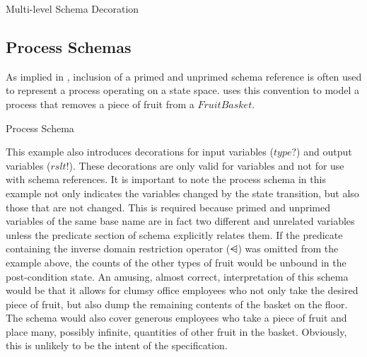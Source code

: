 \documentclass[letterpaper,10pt,draft]{book}
\begin{document}
\begin{example}
\begin{minipage}[t]{0.49\linewidth}
   
\end{minipage}
\begin{minipage}[t]{0.49\linewidth}
   \azsch
   
\end{minipage}

   \caption{Multi-level Schema Decoration}
   \label{ex:SchemaMultiDecor}
\end{example}

\subsection{Process Schemas}
   \label{sect:SchProcess}

As implied in , inclusion of a primed and unprimed schema
reference is often used to represent a process operating on a state space.  
uses this convention to model a process that removes a piece of fruit from a $FruitBasket$.

\begin{example}
\begin{minipage}[t]{0.49\linewidth}
   
\end{minipage}
\begin{minipage}[t]{0.49\linewidth}
   \azsch
   
\end{minipage}

   \caption{Process Schema}
   \label{ex:SchemaProc}
\end{example}

This example also introduces decorations for input variables ($type?$) and output
variables ($rslt!$).  These decorations are only valid for variables and not for
use with schema references.  It is important to note the process schema in this example
not only indicates the variables changed by the state transition, but also those
that are not changed.  This is required because primed and unprimed variables of
the same base name are in fact two different and unrelated variables unless the
predicate section of schema explicitly relates them.  If the predicate containing
the inverse domain restriction operator ($\ndres$) was omitted from the example
above, the counts of the other types of fruit would be unbound in the post-condition
state.  An amusing, almost correct, interpretation of this schema would be that
it allows for clumsy office employees who not only take the desired piece of fruit,
but also dump the remaining contents of the basket on the floor.  The schema would
also cover generous employees who take a piece of fruit and place many, possibly
infinite, quantities of other fruit in the basket.  Obviously, this is unlikely
to be the intent of the specification.
\end{document}
